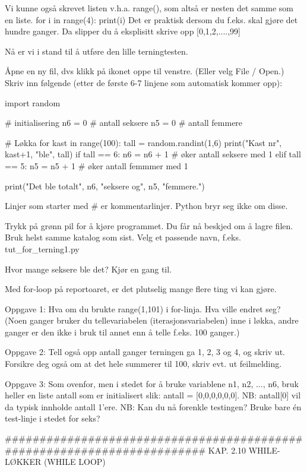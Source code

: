 \documentclass[a4paper,11pt,utf8]{book}
\begin{document}
Vi kunne også skrevet listen v.h.a. range(), som altså er nesten det samme som en liste. 
for i in range(4): 
    print(i) 
Det er praktisk dersom du f.eks. skal gjøre det hundre ganger.
Da slipper du å eksplisitt skrive opp [0,1,2,....,99]


Nå er vi i stand til å utføre den lille terningtesten. 

Åpne en ny fil, dvs klikk på ikonet oppe til venstre. (Eller velg File / Open.)
Skriv inn følgende (etter de første 6-7 linjene som automatisk kommer opp): 

import random

# initialisering
n6 = 0  # antall seksere
n5 = 0  # antall femmere

# Løkka 
for kast in range(100):
    tall = random.randint(1,6)
    print("Kast nr", kast+1, "ble", tall)
    if tall == 6:
       n6 = n6 + 1    # øker antall seksere med 1
    elif tall == 5:
       n5 = n5 + 1    # øker antall femmmer med 1

print("Det ble totalt", n6, "seksere og", n5, "femmere.")


Linjer som starter med # er kommentarlinjer. 
Python bryr seg ikke om disse. 

Trykk på grønn pil for å kjøre programmet.
Du får nå beskjed om å lagre filen. Bruk helst samme katalog som sist.
Velg et passende navn, f.eks. tut_for_terning1.py

Hvor mange seksere ble det?
Kjør en gang til.

Med for-loop på reportoaret, er det plutselig mange flere ting vi kan gjøre. 



Oppgave 1: Hva om du brukte range(1,101) i for-linja. Hva ville endret seg?
(Noen ganger bruker du tellevariabelen (iterasjonsvariabelen) inne i løkka,
andre ganger er den ikke i bruk til annet enn å telle f.eks. 100 ganger.) 


Oppgave 2: Tell også opp antall ganger terningen ga 1, 2, 3 og 4, og skriv ut.
Forsikre deg også om at det hele summerer til 100, skriv evt. ut feilmelding. 


Oppgave 3: Som ovenfor, men i stedet for å bruke variablene n1, n2, ..., n6,
bruk heller en liste antall som er initialisert slik: antall = [0,0,0,0,0,0].
NB: antall[0] vil da typisk innholde antall 1'ere. 
NB: Kan du nå forenkle testingen? Bruke bare én test-linje i stedet for seks? 





######################################################################## 
KAP. 2.10  WHILE-LØKKER (WHILE LOOP)
\end{document}
